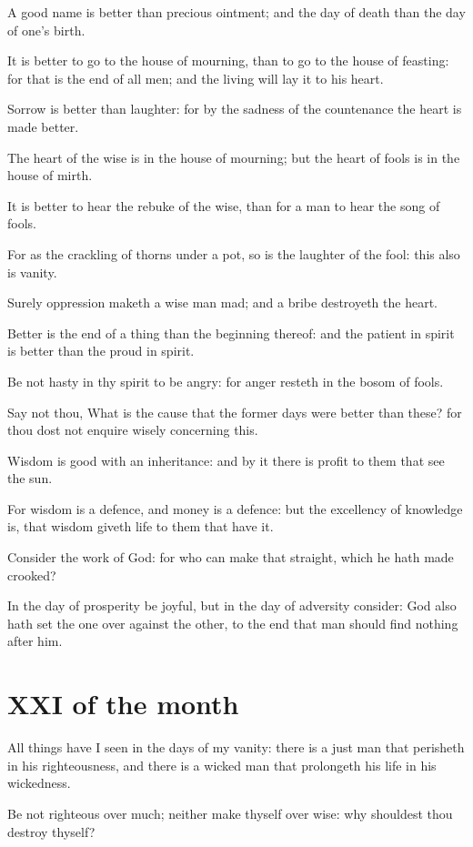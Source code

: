 A good name is better than precious ointment; and the day of death than the day of one's birth.

It is better to go to the house of mourning, than to go to the house of feasting: for that is the end of all men; and the living will lay it to his heart.

Sorrow is better than laughter: for by the sadness of the countenance the heart is made better.

The heart of the wise is in the house of mourning; but the heart of fools is in the house of mirth.

It is better to hear the rebuke of the wise, than for a man to hear the song of fools.

For as the crackling of thorns under a pot, so is the laughter of the fool: this also is vanity.

\verseamended Surely oppression maketh a wise man mad; and a bribe destroyeth the heart.

Better is the end of a thing than the beginning thereof: and the patient in spirit is better than the proud in spirit.

Be not hasty in thy spirit to be angry: for anger resteth in the bosom of fools.

Say not thou, What is the cause that the former days were better than these? for thou dost not enquire wisely concerning this.

Wisdom is good with an inheritance: and by it there is profit to them that see the sun.

For wisdom is a defence, and money is a defence: but the excellency of knowledge is, that wisdom giveth life to them that have it.

Consider the work of God: for who can make that straight, which he hath made crooked?

In the day of prosperity be joyful, but in the day of adversity consider: God also hath set the one over against the other, to the end that man should find nothing after him.

\section{XXI of the month}

All things have I seen in the days of my vanity: there is a just man that perisheth in his righteousness, and there is a wicked man that prolongeth his life in his wickedness.

Be not righteous over much; neither make thyself over wise: why shouldest thou destroy thyself?

